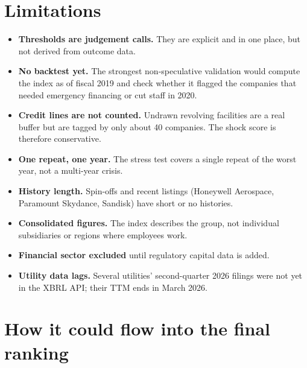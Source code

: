 \documentclass[11pt,a4paper]{article}
\begin{document}
\section{Limitations}
\begin{itemize}
  \item \textbf{Thresholds are judgement calls.} They are explicit and in one place, but not derived from outcome data.
  \item \textbf{No backtest yet.} The strongest non-speculative validation would compute the index as of fiscal 2019 and check whether it flagged the companies that needed emergency financing or cut staff in 2020.
  \item \textbf{Credit lines are not counted.} Undrawn revolving facilities are a real buffer but are tagged by only about 40 companies. The shock score is therefore conservative.
  \item \textbf{One repeat, one year.} The stress test covers a single repeat of the worst year, not a multi-year crisis.
  \item \textbf{History length.} Spin-offs and recent listings (Honeywell Aerospace, Paramount Skydance, Sandisk) have short or no histories.
  \item \textbf{Consolidated figures.} The index describes the group, not individual subsidiaries or regions where employees work.
  \item \textbf{Financial sector excluded} until regulatory capital data is added.
  \item \textbf{Utility data lags.} Several utilities' second-quarter 2026 filings were not yet in the XBRL API; their TTM ends in March 2026.
\end{itemize}

\section{How it could flow into the final ranking}
\end{document}
